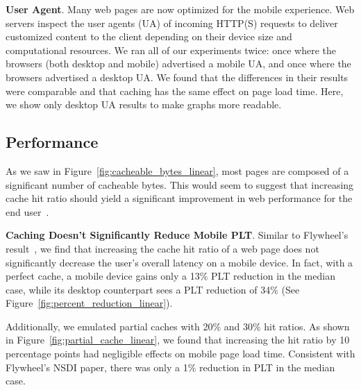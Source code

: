 \textbf{User Agent}. Many web pages are now optimized for the mobile experience. Web servers inspect the user agents (UA) of incoming HTTP(S) requests to deliver customized content to the client depending on their device size and computational resources. We ran all of our experiments twice: once where the browsers (both desktop and mobile) advertised a mobile UA, and once where the browsers advertised a desktop UA. We found that the differences in their results were comparable and that caching has the same effect on page load time. Here, we show only desktop UA results to make graphs more readable.

\subsection{Performance}
As we saw in Figure~\ref{fig:cacheable_bytes_linear}, most pages are composed of a significant number of cacheable bytes. This would seem to suggest that increasing cache hit ratio should yield a significant improvement in web performance for the end user~\cite{kroeger1997exploring}.

\textbf{Caching Doesn't Significantly Reduce Mobile PLT}.
Similar to Flywheel's result~\cite{flywheel}, we find that increasing the cache hit ratio of a web page does not significantly decrease the user's overall latency on a mobile device.
In fact, with a perfect cache, a mobile device gains only a 13\% PLT reduction in the median case, while its desktop counterpart sees a  PLT reduction of 34\% (See Figure~\ref{fig:percent_reduction_linear}).

Additionally, we emulated partial caches with 20\% and 30\% hit ratios. As shown in Figure~\ref{fig:partial_cache_linear}, we found that increasing the hit ratio by 10 percentage points had negligible effects on mobile page load time. Consistent with Flywheel's NSDI paper, there was only a 1\% reduction in PLT in the median case.

